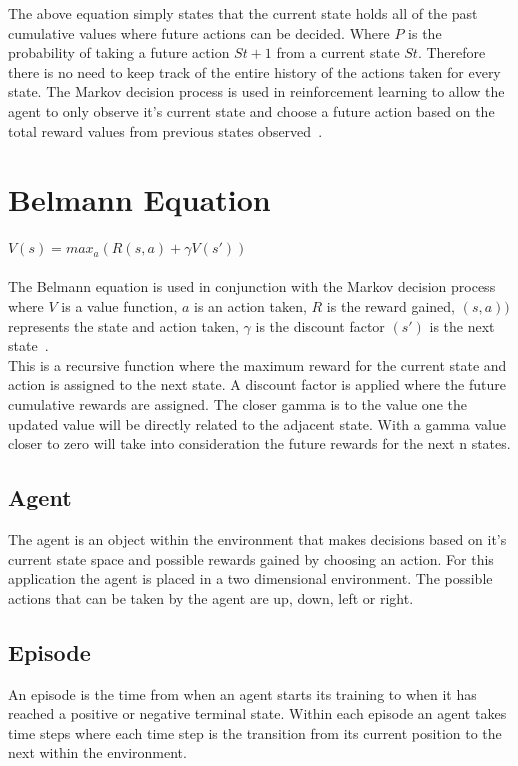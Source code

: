 The above equation simply states that the current state holds all of the past cumulative values where future actions can be decided.
Where $P$ is the probability of taking a future action $St+1$  from a current state $St$. Therefore there is no need to keep track of the entire history of the actions taken for every state. The Markov decision process is used in reinforcement learning to allow the agent to only observe it's current state and choose a future action based on the total reward values from previous states observed~\cite[p.~67]{sutton_barto_2018}.

\section{Belmann Equation}
$V(s) = max_{a}(R(s,a)+\gamma V(s'))$\\\\

The Belmann equation is used in conjunction with the Markov decision process where $V$ is a value function, $a$ is an action taken, $R$ is the reward gained, $(s,a))$ represents the state and action taken, $\gamma$ is the discount factor $(s')$ is the next state~\cite[p.~75]{sutton_barto_2018}.
\\

This is a recursive function where the maximum reward for the current state and action is assigned to the next state. A discount factor is applied where the future cumulative rewards are assigned. The closer gamma is to the value one the updated value will be directly related to the adjacent state. With a gamma value closer to zero will take into consideration the future rewards for the next n states.
\subsection{Agent}
The agent is an object within the environment that makes decisions based on it's current state space and possible rewards gained by choosing an action. For this application the agent is placed in a two dimensional environment. The possible actions that can be taken by the agent are up, down, left or right.\\
\subsection{Episode}
An episode is the time from when an agent starts its training to when it has reached a positive or negative terminal state. Within each episode an agent takes time steps where each time step is the transition from its current position to the next within the environment.
